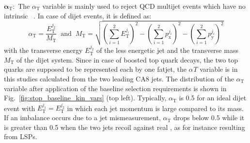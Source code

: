 \begin{description}
 \item $\mathbf{\alpha_\mathrm{T}:}$ The $\alpha_\mathrm{T}$ variable is mainly used to reject QCD multijet events which have no intrinsic \met~\cite{Chatrchyan:2012wa, Chatrchyan:2013lya}. In case of dijet events, it is defined as:
\begin{equation}
 \alpha_\mathrm{T} = \frac{E_\mathrm{T}^{j_2}}{M_\mathrm{T}} \;\; \mathrm{and} \;\; M_\mathrm{T} = \sqrt{\left( \sum_{i=1}^{2} E_\mathrm{T}^{j_i} \right)^2 - \left( \sum_{i=1}^{2} p_\mathrm{x}^{j_i} \right)^2 - \left( \sum_{i=1}^{2} p_\mathrm{y}^{j_i} \right)^2}
\end{equation}
with the transverse energy $E_\mathrm{T}^{j_2}$ of the less energetic jet and the transverse mass $M_\mathrm{T}$ of the dijet system. Since in case of boosted top quark decays, the two top quarks are supposed to be represented each by one fatjet, the $\alpha_\mathrm{}T$ variable is in this studies calculated from the two leading CA8 jets. The distribution of the $\alpha_\mathrm{T}$ variable after application of the baseline selection requirements is shown in Fig.~\ref{fig:stop_baseline_kin_vars} (top left). Typically, $\alpha_\mathrm{T}$ is 0.5 for an ideal dijet event with $E_\mathrm{T}^{j_1} = E_\mathrm{T}^{j_2}$ in which each jet momentum is large compared to its mass. If an imbalance occurs due to a jet mismeasurement, $\alpha_\mathrm{T}$ drops below 0.5 while it is greater than 0.5 when the two jets recoil against real \met, as for instance resulting from LSPs.


\end{description}

